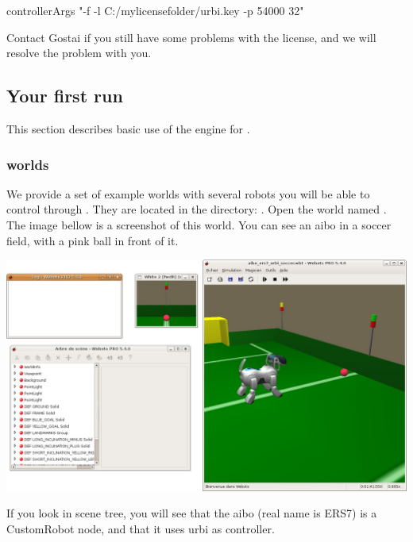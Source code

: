 \begin{shell}
controllerArgs "-f -l C:/mylicensefolder/urbi.key  -p 54000 32"
\end{shell}

Contact Gostai if you still have some problems with the license, and
we will resolve the problem with you.

\subsection{Your first run}

This section describes basic use of the \urbi engine for \webots.

\subsubsection{\urbi worlds}

We provide a set of example worlds with several robots you will be
able to control through \urbi. They are located in the directory:
.  Open the
world named . The image bellow is a
screenshot of this world. You can see an aibo in a soccer field, with
a pink ball in front of it.


\begin{center}
  \includegraphics[width=\linewidth]{img/webots/aibo-soccer}
\end{center}

If you look in \webots scene tree, you will see that the aibo (real
name is ERS7) is a CustomRobot node, and that it uses urbi as
controller.


